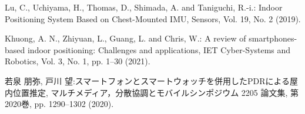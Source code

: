 \begin{thebibliography}{参考文献}
	Lu, C., Uchiyama, H., Thomas, D., Shimada, A. and Taniguchi, R.-i.: Indoor Positioning System Based on Chest-Mounted IMU, Sensors, Vol. 19, No. 2 (2019).

	Khuong, A. N., Zhiyuan, L., Guang, L. and Chris, W.: A review of smartphones-based indoor positioning: Challenges and applications, IET Cyber-Systems and Robotics, Vol. 3, No. 1, pp. 1–30 (2021).

	若泉 朋弥, 戸川 望:スマートフォンとスマートウォッチを併用したPDRによる屋内位置推定, マルチメディア，分散協調とモバイルシンポジウム 2205 論文集, 第2020巻, pp. 1290–1302 (2020).



\end{thebibliography}
